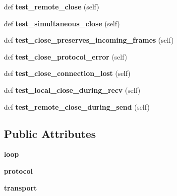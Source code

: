 \begin{DoxyCompactItemize}
def {\bfseries test\+\_\+remote\+\_\+close} (self)
\item 
\mbox{\label{classwebsockets_1_1test__protocol_1_1_common_tests_ad9e788720743842f2f293f3b950cabed}} 
def {\bfseries test\+\_\+simultaneous\+\_\+close} (self)
\item 
\mbox{\label{classwebsockets_1_1test__protocol_1_1_common_tests_a9a9261f475a8801a130624b8c533bbe1}} 
def {\bfseries test\+\_\+close\+\_\+preserves\+\_\+incoming\+\_\+frames} (self)
\item 
\mbox{\label{classwebsockets_1_1test__protocol_1_1_common_tests_a42dd8d5d1dcefcc3bed37e87f138ca5a}} 
def {\bfseries test\+\_\+close\+\_\+protocol\+\_\+error} (self)
\item 
\mbox{\label{classwebsockets_1_1test__protocol_1_1_common_tests_ac422a1343129e00b947a6d549cba69af}} 
def {\bfseries test\+\_\+close\+\_\+connection\+\_\+lost} (self)
\item 
\mbox{\label{classwebsockets_1_1test__protocol_1_1_common_tests_a5a9f12e6ba6bacc89ed2ba7a98e3efa5}} 
def {\bfseries test\+\_\+local\+\_\+close\+\_\+during\+\_\+recv} (self)
\item 
\mbox{\label{classwebsockets_1_1test__protocol_1_1_common_tests_a52a28832e94cca68e3762ed43a428c77}} 
def {\bfseries test\+\_\+remote\+\_\+close\+\_\+during\+\_\+send} (self)
\end{DoxyCompactItemize}
\subsection*{Public Attributes}
\begin{DoxyCompactItemize}
\item 
\mbox{\label{classwebsockets_1_1test__protocol_1_1_common_tests_a1c668a713995b3e5134e63b0183f7f5b}} 
{\bfseries loop}
\item 
\mbox{\label{classwebsockets_1_1test__protocol_1_1_common_tests_ae73483f68e502c587aaf4560aa7e4178}} 
{\bfseries protocol}
\item 
\mbox{\label{classwebsockets_1_1test__protocol_1_1_common_tests_a9f0cc627ba9e4efcce88494d1feef34b}} 
{\bfseries transport}
\end{DoxyCompactItemize}
